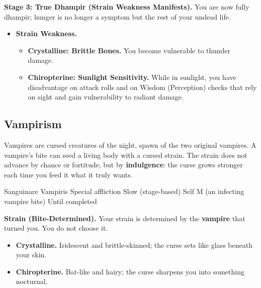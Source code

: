 \documentclass[letterpaper,twocolumn,openany,nodeprecatedcode,breakable,skins,xparse,most]{dndbook}
\begin{document}
\textbf{Stage 3: True Dhampir (Strain Weakness Manifests).}
You are now fully dhampir; hunger is no longer a symptom but the rest of your undead life.
\begin{itemize}
\item \textbf{Strain Weakness.}
\begin{itemize}
\item \textbf{Crystalline: Brittle Bones.} You become vulnerable to thunder damage.
\item \textbf{Chiropterine: Sunlight Sensitivity.} While in sunlight, you have disadvantage on attack rolls and on Wisdom (Perception) checks that rely on sight and gain vulnerability to radiant damage.
\end{itemize}
\end{itemize}

\subsection{Vampirism}

Vampires are cursed creatures of the night, spawn of the two original vampires. A vampire's bite can seed a living body with a cursed strain. The strain does not advance by chance or fortitude, but by \textbf{indulgence}: the curse grows stronger each time you feed it what it truly wants.

\DndSpellHeader%
  {Sanguinare Vampiris}
  {Special affliction}
  {Slow (stage-based)}
  {Self}
  {M (an infecting vampire bite)}
  {Until completed}

\textbf{Strain (Bite-Determined).} Your strain is determined by the \textbf{vampire} that turned you. You do not choose it.
\begin{itemize}
\item \textbf{Crystalline.} Iridescent and brittle-skinned; the curse sets like glass beneath your skin.
\item \textbf{Chiropterine.} Bat-like and hairy; the curse sharpens you into something nocturnal.
\end{itemize}
\end{document}
